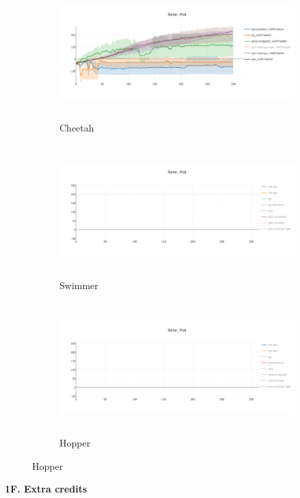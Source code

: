 \documentclass[10pt]{article}
\begin{document}
\begin{figure}[ht!]
    \centering
    \begin{subfigure}[h]{0.6\linewidth}
        \centering
        \includegraphics[height=2in]{figures/entropy.png}
        \caption{Cheetah}
    \end{subfigure}
    \vskip 0.3in
    \begin{subfigure}[h]{0.6\textwidth}
        \centering
        \includegraphics[height=2in]{figures/newplot.png}
        \caption{Swimmer}
    \end{subfigure}
    \vskip 0.3in
    \begin{subfigure}[h]{0.6\textwidth}
        \centering
        \includegraphics[height=2in]{figures/newplot.png}
        \caption{Hopper}
    \end{subfigure}
\end{figure}
\clearpage
\textbf{1F. Extra credits}
\end{document}
